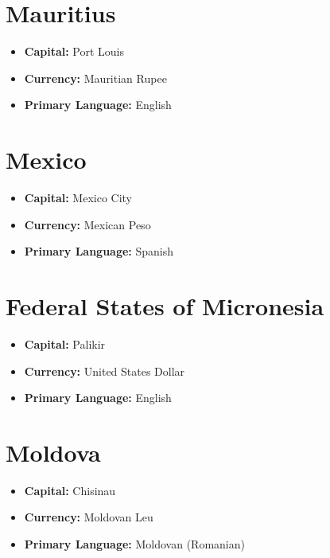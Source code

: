 \documentclass[a4paper,100pt,twoside]{book}
\begin{document}
\section*{\Huge Mauritius}
\vspace{5mm} %
\begin{itemize}
	\item \textbf{Capital:} Port Louis
	\item \textbf{Currency:} Mauritian Rupee
	\item \textbf{Primary Language:} English
\end{itemize}

\section*{\Huge Mexico}
\vspace{5mm} %
\begin{itemize}
	\item \textbf{Capital:} Mexico City
	\item \textbf{Currency:} Mexican Peso
	\item \textbf{Primary Language:} Spanish
\end{itemize}

\section*{\Huge Federal States of Micronesia}
\vspace{5mm} %
\begin{itemize}
	\item \textbf{Capital:} Palikir
	\item \textbf{Currency:} United States Dollar
	\item \textbf{Primary Language:} English
\end{itemize}

\section*{\Huge Moldova}
\vspace{5mm} %
\begin{itemize}
	\item \textbf{Capital:} Chisinau
	\item \textbf{Currency:} Moldovan Leu
	\item \textbf{Primary Language:} Moldovan (Romanian)
\end{itemize}
\end{document}
